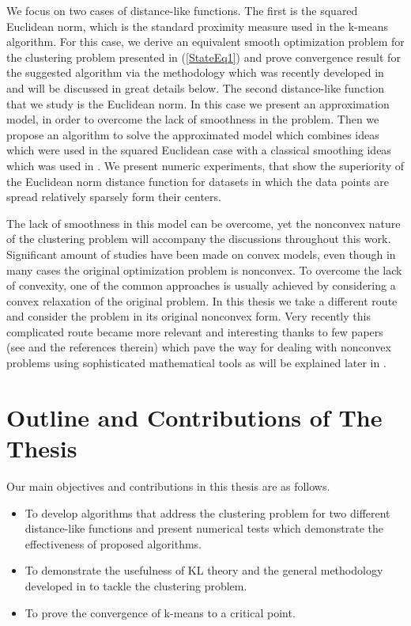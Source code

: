 We focus on two cases of distance-like functions. The first is the squared Euclidean norm, which is the standard proximity measure used in the k-means algorithm. For this case, we derive an equivalent smooth optimization problem for the clustering problem presented in (\ref{StateEq1}) and prove convergence result for the suggested algorithm via the methodology which was recently developed in \cite{BST2014} and will be discussed in great details below. The second distance-like function that we study is the Euclidean norm. In this case we present an approximation model, in order to overcome the lack of smoothness in the problem. Then we propose an algorithm to solve the approximated model which combines ideas which were used in the squared Euclidean case with a classical smoothing ideas which was used in \cite{BS2015}. We present numeric experiments, that show the superiority of the Euclidean norm distance function for datasets in which the data points are spread relatively sparsely form their centers. \medskip

The lack of smoothness in this model can be overcome, yet the nonconvex nature of the clustering problem will accompany the discussions throughout this work. Significant amount of studies have been made on convex models, even though in many cases the original optimization problem is nonconvex. To overcome the lack of convexity, one of the common approaches is usually achieved by considering a convex relaxation of the original problem. In this thesis we take a different route and consider the problem in its original nonconvex form. Very recently this complicated route became more relevant and interesting thanks to few papers (see \cite{AB2009,ABS2013,BST2014} and the references therein) which pave the way for dealing with nonconvex problems using sophisticated mathematical tools as will be explained later in .


\section{Outline and Contributions of The Thesis}

Our main objectives and contributions in this thesis are as follows.
\begin{itemize}
	\item To develop algorithms that address the clustering problem for two different distance-like functions and present numerical tests which demonstrate the effectiveness of proposed algorithms.
	
	\item To demonstrate the usefulness of KL theory and the general methodology developed in \cite{BST2014} to tackle the clustering problem.
  
	\item To prove the convergence of k-means to a critical point.
\end{itemize}


